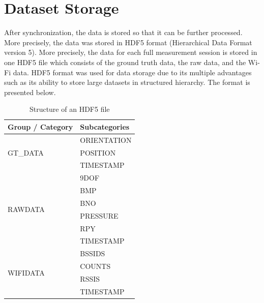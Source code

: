 \section{Dataset Storage}
After synchronization, the data is stored so that it can be further processed. More precisely, the data was stored in HDF5 format (Hierarchical Data Format version 5). More precisely, the data for each full measurement session is stored in one HDF5 file which consists of the ground truth data, the raw data, and the Wi-Fi data. HDF5 format was used for data storage due to its multiple advantages such as its ability to store large datasets in structured hierarchy. The format is presented below.  \cite{hierarchical}
\par
\begin{table}[h!]
\centering
\renewcommand{\arraystretch}{1.1} %
\setlength{\tabcolsep}{8pt} %
\begin{tabular}{|l|l|}
\hline
\textbf{Group / Category} & \textbf{Subcategories} \\ \hline
\multirow{3}{*}{GT\_DATA}  & ORIENTATION            \\ \cline{2-2}
                           & POSITION               \\ \cline{2-2}
                           & TIMESTAMP              \\ \hline
\multirow{6}{*}{RAWDATA}   & 9DOF                   \\ \cline{2-2}
                           & BMP                    \\ \cline{2-2}
                           & BNO                    \\ \cline{2-2}
                           & PRESSURE               \\ \cline{2-2}
                           & RPY                    \\ \cline{2-2}
                           & TIMESTAMP              \\ \hline
\multirow{4}{*}{WIFIDATA}  & BSSIDS                 \\ \cline{2-2}
                           & COUNTS                 \\ \cline{2-2}
                           & RSSIS                  \\ \cline{2-2}
                           & TIMESTAMP              \\ \hline
\end{tabular}
\caption{Structure of an HDF5 file}
\label{tab:hdf5_structure}
\end{table}